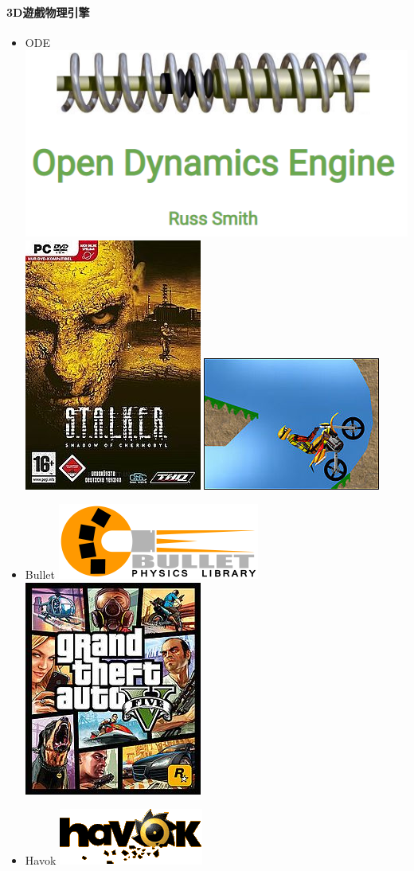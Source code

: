 \paragraph{3D遊戲物理引擎}
\begin{itemize}
    \item{ODE}
        \includegraphics[height=0.2\linewidth]{./resources/physics/ODE(1).png}
                \includegraphics[width=0.1\linewidth]{./resources/physics/ODE(2).png}
                 \includegraphics[width=0.1\linewidth]{./resources/physics/ODE(3).png}
    \item{Bullet}
        \includegraphics[height=0.2\linewidth]{./resources/physics/bullet(1).png}
                \includegraphics[width=0.1\linewidth]{./resources/physics/bullet(2).png} 
    \item{Havok}
        \includegraphics[height=0.2\linewidth]{./resources/physics/havok(1).png}

\end{itemize}
